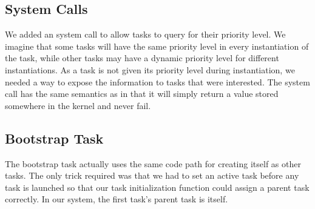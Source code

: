 \documentclass[pdftex,10pt,a4paper]{article}
\begin{document}
\subsection*{System Calls}

We added an  system call to allow tasks to query
for their priority level. We imagine that some tasks will have the
same priority level in every instantiation of the task, while other
tasks may have a dynamic priority level for different
instantiations. As a task is not given its priority level during
instantiation, we needed a way to expose the information to tasks that
were interested. The  system call has the same
semantics as  in that it will simply return a value
stored somewhere in the kernel and never fail.

\subsection*{Bootstrap Task}

The bootstrap task actually uses the same code path for creating
itself as other tasks. The only trick required was that we had to set
an active task before any task is launched so that our task
initialization function could assign a parent task correctly. In our
system, the first task's parent task is itself.
\end{document}
